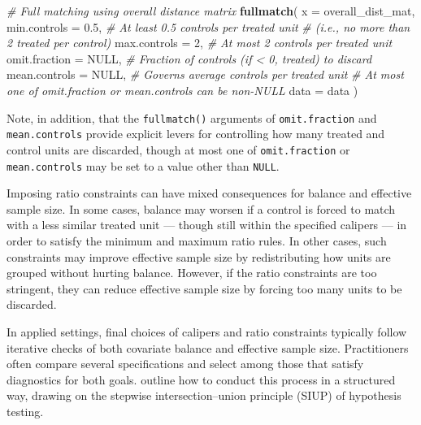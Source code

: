 \documentclass[
  12pt,
  leqno]{article}
\newenvironment{Shaded}{\begin{snugshade}}{\end{snugshade}}
\newcommand{\AttributeTok}[1]{\textcolor[rgb]{0.13,0.29,0.53}{#1}}
\newcommand{\CommentTok}[1]{\textcolor[rgb]{0.56,0.35,0.01}{\textit{#1}}}
\newcommand{\ConstantTok}[1]{\textcolor[rgb]{0.56,0.35,0.01}{#1}}
\newcommand{\DecValTok}[1]{\textcolor[rgb]{0.00,0.00,0.81}{#1}}
\newcommand{\FloatTok}[1]{\textcolor[rgb]{0.00,0.00,0.81}{#1}}
\newcommand{\FunctionTok}[1]{\textcolor[rgb]{0.13,0.29,0.53}{\textbf{#1}}}
\newcommand{\NormalTok}[1]{#1}
\begin{document}
\begin{Shaded}
\begin{Highlighting}[]
\CommentTok{\# Full matching using overall distance matrix}
\FunctionTok{fullmatch}\NormalTok{(}
  \AttributeTok{x =}\NormalTok{ overall\_dist\_mat,}
  \AttributeTok{min.controls =} \FloatTok{0.5}\NormalTok{,   }\CommentTok{\# At least 0.5 controls per treated unit}
                        \CommentTok{\# (i.e., no more than 2 treated per control)}
  \AttributeTok{max.controls =} \DecValTok{2}\NormalTok{,     }\CommentTok{\# At most 2 controls per treated unit}
  \AttributeTok{omit.fraction =} \ConstantTok{NULL}\NormalTok{, }\CommentTok{\# Fraction of controls (if \textless{} 0, treated) to discard}
  \AttributeTok{mean.controls =} \ConstantTok{NULL}\NormalTok{, }\CommentTok{\# Governs average controls per treated unit}
  \CommentTok{\# At most one of omit.fraction or mean.controls can be non{-}NULL}
  \AttributeTok{data =}\NormalTok{ data}
\NormalTok{)}
\end{Highlighting}
\end{Shaded}

\doublespacing

Note, in addition, that the \texttt{fullmatch()} arguments of
\texttt{omit.fraction} and \texttt{mean.controls} provide explicit
levers for controlling how many treated and control units are discarded,
though at most one of \texttt{omit.fraction} or \texttt{mean.controls}
may be set to a value other than \texttt{NULL}.

Imposing ratio constraints can have mixed consequences for balance and
effective sample size. In some cases, balance may worsen if a control is
forced to match with a less similar treated unit --- though still within
the specified calipers --- in order to satisfy the minimum and maximum
ratio rules. In other cases, such constraints may improve effective
sample size by redistributing how units are grouped without hurting
balance. However, if the ratio constraints are too stringent, they can
reduce effective sample size by forcing too many units to be discarded.

In applied settings, final choices of calipers and ratio constraints
typically follow iterative checks of both covariate balance and
effective sample size. Practitioners often compare several
specifications and select among those that satisfy diagnostics for both
goals. \citet{hansensales2015} outline how to conduct this process in a
structured way, drawing on the stepwise intersection--union principle
(SIUP) of hypothesis testing.
\end{document}
